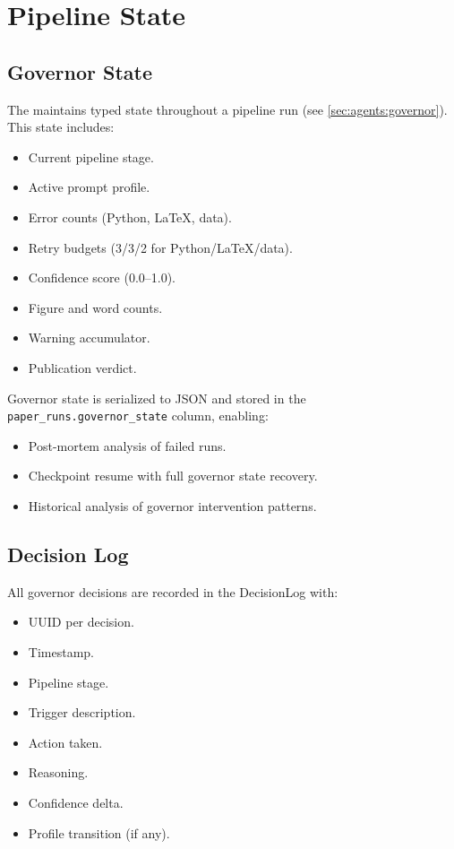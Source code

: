 \section{Pipeline State}
\label{sec:memory:pipeline}

\subsection{Governor State}

The \governor maintains typed state throughout a pipeline run (see \cref{sec:agents:governor}).
This state includes:

\begin{itemize}
  \item Current pipeline stage.
  \item Active prompt profile.
  \item Error counts (Python, \LaTeX{}, data).
  \item Retry budgets (3/3/2 for Python/\LaTeX{}/data).
  \item Confidence score (0.0--1.0).
  \item Figure and word counts.
  \item Warning accumulator.
  \item Publication verdict.
\end{itemize}

Governor state is serialized to JSON and stored in the \texttt{paper\_runs.governor\_state} column, enabling:
\begin{itemize}
  \item Post-mortem analysis of failed runs.
  \item Checkpoint resume with full governor state recovery.
  \item Historical analysis of governor intervention patterns.
\end{itemize}

\subsection{Decision Log}

All governor decisions are recorded in the DecisionLog with:
\begin{itemize}
  \item UUID per decision.
  \item Timestamp.
  \item Pipeline stage.
  \item Trigger description.
  \item Action taken.
  \item Reasoning.
  \item Confidence delta.
  \item Profile transition (if any).
\end{itemize}


